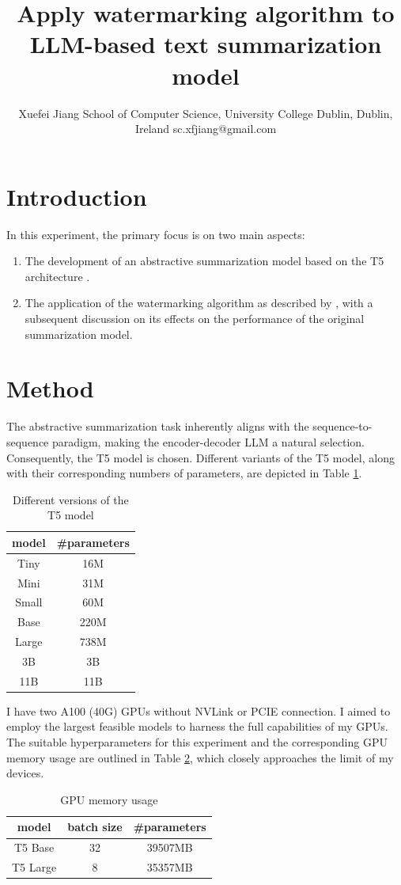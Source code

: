 \documentclass{article}
\title{Apply watermarking algorithm to LLM-based text summarization model}
\author{
Xuefei Jiang
\affiliations
School of Computer Science, University College Dublin, Dublin, Ireland
\emails
sc.xfjiang@gmail.com
}
\begin{document}
\maketitle
\section{Introduction}
In this experiment, the primary focus is on two main aspects:
\begin{enumerate}
	\item The development of an abstractive summarization model based on the T5 architecture \cite{raffel2020exploring}.
	\item The application of the watermarking algorithm as described by \cite{kirchenbauer2023watermark}, with a subsequent discussion on its effects on the performance of the original summarization model.
\end{enumerate}

\section{Method}
The abstractive summarization task inherently aligns with the sequence-to-sequence paradigm, making the encoder-decoder LLM a natural selection. Consequently, the T5 model is chosen. Different variants of the T5 model, along with their corresponding numbers of parameters, are depicted in Table \ref{tab:t5}.

\begin{table}[H]
	\centering
	\begin{tabular}{|c|c|}
		\hline
		model & \#parameters \\ \hline
		Tiny  & 16M          \\ \hline
		Mini  & 31M          \\ \hline
		Small & 60M          \\ \hline
		Base  & 220M         \\ \hline
		Large & 738M         \\ \hline
		3B    & 3B           \\ \hline
		11B   & 11B          \\ \hline
	\end{tabular}
	\caption{Different versions of the T5 model}
	\label{tab:t5}
\end{table}

I have two A100 (40G) GPUs without NVLink or PCIE connection. I aimed to employ the largest feasible models to harness the full capabilities of my GPUs. The suitable hyperparameters for this experiment and the corresponding GPU memory usage are outlined in Table \ref{tab:gpu_memory}, which closely approaches the limit of my devices.
\begin{table}[H]
	\centering
	\begin{tabular}{|c|c|c|}
		\hline
		model & batch size & \#parameters \\ \hline
		T5 Base  & 32         & 39507MB     \\ \hline
		T5 Large & 8          & 35357MB     \\ \hline
	\end{tabular}
	\caption{GPU memory usage}
	\label{tab:gpu_memory}
\end{table}
\end{document}
